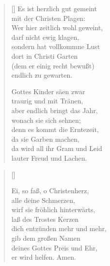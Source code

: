 \begin{multicols}{2}
\begin{verse}[\versewidth]
 Es ist herzlich gut gemeint\\
mit der Christen Plagen:\\
Wer hier zeitlich wohl geweint,\\
darf nicht ewig klagen,\\
sondern hat vollkommne Lust\\
dort in Christi Garten\\
(dem er einig recht bewußt)\\
endlich zu gewarten.

 Gottes Kinder säen zwar\\
traurig und mit Tränen,\\
aber endlich bringt das Jahr,\\
wonach sie sich sehnen;\\
denn es kommt die Erntezeit,\\
da sie Garben machen,\\
da wird all ihr Gram und Leid\\
lauter Freud und Lachen.

\end{verse}
\end{multicols}

\begin{center}
\settowidth{\versewidth}{Der, vor dem die Welt erschrickt,}
\begin{verse}[\versewidth]



 Ei, so faß, o Christenherz,\\
alle deine Schmerzen,\\
wirf sie fröhlich hinterwärts,\\
laß des Trostes Kerzen\\
dich entzünden mehr und mehr,\\
gib dem großen Namen\\
deines Gottes Preis und Ehr,\\
er wird helfen. Amen.

  
\end{verse}
\end{center}



